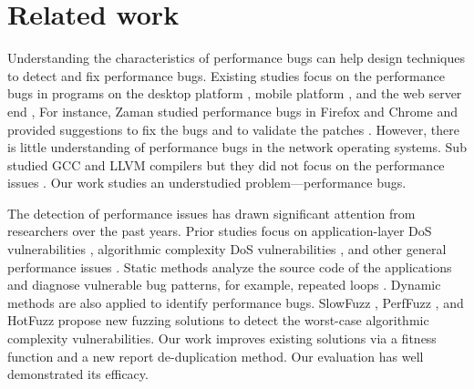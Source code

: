 \section{Related work}
\label{s:relwk}

Understanding the characteristics of performance bugs can help design techniques to detect and fix performance bugs.
%
Existing studies focus on the performance bugs in programs on the desktop platform \cite{perfbugstudy, zaman2012qualitative}, mobile platform \cite{liu2014characterizing}, and the web server end \cite{perfbugstudy}, \etc{}
%
For instance, Zaman \etal{} studied performance bugs in Firefox and Chrome and provided suggestions to fix the bugs and to validate the patches \cite{zaman2012qualitative}.
%
However, there is little understanding of performance bugs in the network operating systems.
%
Sub \etal{} studied GCC and LLVM compilers but they did not focus on the performance issues \cite{sun2016toward}.
%
Our work studies an understudied problem---performance bugs.

The detection of performance issues has drawn significant attention from researchers over the past years.
%
Prior studies focus on application-layer DoS vulnerabilities \cite{rampart, jazi2017detecting, durcekova2012sophisticated}, 
%
algorithmic complexity DoS vulnerabilities \cite{crosby2003algodos, smith2006backtracking}, and other general performance issues \cite{perfbugstudy,liu2014characterizing}.
Static methods analyze the source code of the applications and diagnose vulnerable bug patterns, for example, repeated loops \cite{nistor2013toddler,nistor2015caramel}.
%
Dynamic methods are also applied to identify performance bugs.
%
SlowFuzz \cite{slowfuzz}, PerfFuzz \cite{perffuzz}, and HotFuzz \cite{hotfuzz} propose new fuzzing solutions to detect the worst-case algorithmic complexity vulnerabilities.
%
%
Our work improves existing solutions via a fitness function and a new report de-duplication method.
%
Our evaluation has well demonstrated its efficacy.
%
